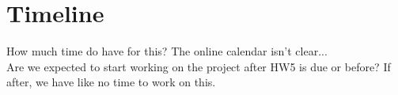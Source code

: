 \section{Timeline}

How much time do have for this? The online calendar isn't clear...  \\

Are we expected to start working on the project after HW5 is due or before? If after, we have like no time to work on this.

